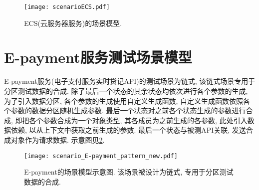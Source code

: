         \begin{figure}[!htb]
            \centering
            \texttt{[image: scenarioECS.pdf]}
            \caption[]{ECS(云服务器服务)的场景模型.}
            \label{fig:ecs_scenario}
        \end{figure}
        
    \section{E-payment服务测试场景模型}
        \label{sec:epayment_scenario_model}
    
        E-payment服务(电子支付服务实时贷记API)的测试场景为链式, 该链式场景专用于分区测试数据的合成. 除了最后一个状态的其余状态均依次进行各个参数的生成, 为了引入数据分区, 各个参数的生成使用自定义生成函数, 自定义生成函数依照各个参数的数据分区随机生成参数. 最后一个状态对之前各个状态生成的参数进行合成, 即把各个参数合成为一个对象类型, 其各成员为之前生成的各参数, 此处引入数据依赖, 以从上下文中获取之前生成的参数. 最后一个状态与被测API关联, 发送合成对象作为请求数据. 示意图见\ref{fig:epayment_scenario}.
        
        \begin{figure}[!htb]
            \centering
            \texttt{[image: scenario\_E-payment\_pattern\_new.pdf]}
            \caption[]{E-payment的场景模型示意图. 该场景被设计为链式, 专用于分区测试数据的合成.}
            \label{fig:epayment_scenario}
        \end{figure}
        